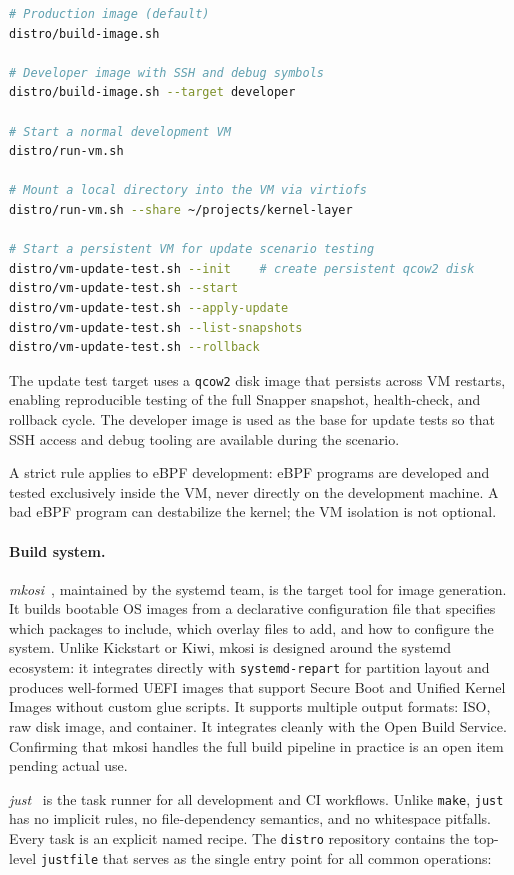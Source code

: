 \begin{lstlisting}[language=bash, caption={distro build targets}]
# Production image (default)
distro/build-image.sh

# Developer image with SSH and debug symbols
distro/build-image.sh --target developer

# Start a normal development VM
distro/run-vm.sh

# Mount a local directory into the VM via virtiofs
distro/run-vm.sh --share ~/projects/kernel-layer

# Start a persistent VM for update scenario testing
distro/vm-update-test.sh --init    # create persistent qcow2 disk
distro/vm-update-test.sh --start
distro/vm-update-test.sh --apply-update
distro/vm-update-test.sh --list-snapshots
distro/vm-update-test.sh --rollback
\end{lstlisting}

The update test target uses a \texttt{qcow2} disk image that persists across
VM restarts, enabling reproducible testing of the full Snapper snapshot,
health-check, and rollback cycle. The developer image is used as the base
for update tests so that SSH access and debug tooling are available during
the scenario.

A strict rule applies to eBPF development: eBPF programs are developed and
tested exclusively inside the VM, never directly on the development machine.
A bad eBPF program can destabilize the kernel; the VM isolation is not
optional.

\paragraph{Build system.}
\emph{mkosi}~\cite{mkosi}, maintained by the systemd team, is the target
tool for image generation. It builds bootable OS images from a declarative
configuration file that specifies which packages to include, which overlay
files to add, and how to configure the system. Unlike Kickstart or Kiwi, mkosi
is designed around the systemd ecosystem: it integrates directly with
\texttt{systemd-repart} for partition layout and produces well-formed UEFI
images that support Secure Boot and Unified Kernel Images without custom glue
scripts. It supports multiple output formats: ISO, raw disk image, and
container. It integrates cleanly with the Open Build Service. Confirming that
mkosi handles the full build pipeline in practice is an open item pending
actual use.

\emph{just}~\cite{just} is the task runner for all development and CI
workflows. Unlike \texttt{make}, \texttt{just} has no implicit rules, no
file-dependency semantics, and no whitespace pitfalls. Every task is an
explicit named recipe. The \texttt{distro} repository contains the top-level
\texttt{justfile} that serves as the single entry point for all common
operations:

